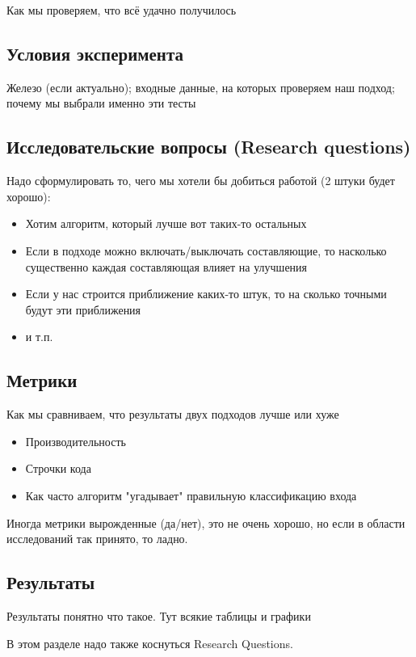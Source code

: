
Как мы проверяем, что  всё удачно получилось

\subsection{Условия эксперимента}
Железо (если актуально); входные данные, на которых проверяем наш подход; почему мы выбрали именно эти тесты

\subsection{Исследовательские вопросы (Research questions)}
Надо сформулировать то, чего мы хотели бы добиться работой (2 штуки будет хорошо):

\begin{itemize}
\item Хотим алгоритм, который лучше вот таких-то остальных
\item Если в подходе можно включать/выключать составляющие, то насколько существенно каждая составляющая влияет на улучшения
\item Если у нас строится приближение каких-то штук, то на сколько точными будут эти приближения
\item и т.п.
\end{itemize}

\subsection{Метрики}

Как мы сравниваем, что результаты двух подходов лучше или хуже
\begin{itemize}
\item Производительность
\item Строчки кода
\item Как часто алгоритм "угадывает" правильную классификацию входа
\end{itemize}

Иногда метрики вырожденные (да/нет), это не очень хорошо, но если в области исследований так принято, то ладно.

\subsection{Результаты}
Результаты понятно что такое. Тут всякие таблицы и графики

В этом разделе надо также коснуться Research Questions.

